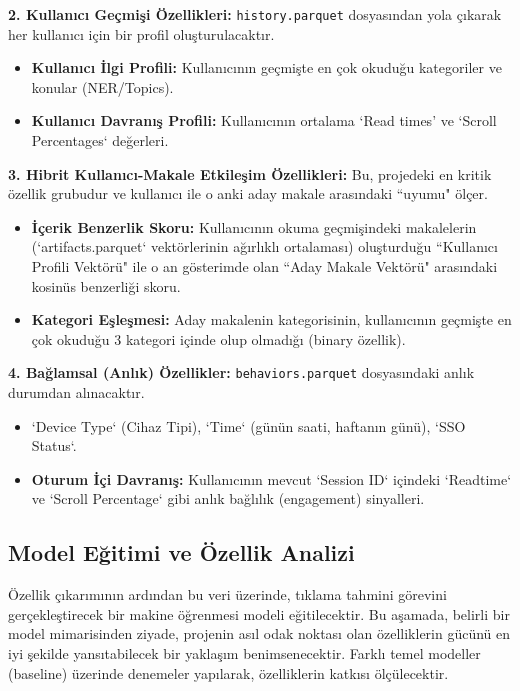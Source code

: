 \documentclass[conference]{IEEEtran}
\begin{document}
\textbf{2. Kullanıcı Geçmişi Özellikleri:} \texttt{history.parquet} dosyasından yola çıkarak her kullanıcı için bir profil oluşturulacaktır.
\begin{itemize}
    \item \textbf{Kullanıcı İlgi Profili:} Kullanıcının geçmişte en çok okuduğu kategoriler ve konular (NER/Topics).
    \item \textbf{Kullanıcı Davranış Profili:} Kullanıcının ortalama `Read times' ve `Scroll Percentages` değerleri.
\end{itemize}

\textbf{3. Hibrit Kullanıcı-Makale Etkileşim Özellikleri:} Bu, projedeki en kritik özellik grubudur ve kullanıcı ile o anki aday makale arasındaki ``uyumu" ölçer.
\begin{itemize}
    \item \textbf{İçerik Benzerlik Skoru:} Kullanıcının okuma geçmişindeki makalelerin (`artifacts.parquet` vektörlerinin ağırlıklı ortalaması) oluşturduğu ``Kullanıcı Profili Vektörü" ile o an gösterimde olan ``Aday Makale Vektörü" arasındaki kosinüs benzerliği skoru.
    \item \textbf{Kategori Eşleşmesi:} Aday makalenin kategorisinin, kullanıcının geçmişte en çok okuduğu 3 kategori içinde olup olmadığı (binary özellik).
\end{itemize}

\textbf{4. Bağlamsal (Anlık) Özellikler:} \texttt{behaviors.parquet} dosyasındaki anlık durumdan alınacaktır.
\begin{itemize}
    \item `Device Type` (Cihaz Tipi), `Time` (günün saati, haftanın günü), `SSO Status`.
    \item \textbf{Oturum İçi Davranış:} Kullanıcının mevcut `Session ID` içindeki `Readtime` ve `Scroll Percentage` gibi anlık bağlılık (engagement) sinyalleri.
\end{itemize}

\subsection{Model Eğitimi ve Özellik Analizi}
Özellik çıkarımının ardından bu veri üzerinde, tıklama tahmini görevini gerçekleştirecek bir makine öğrenmesi modeli eğitilecektir. Bu aşamada, belirli bir model mimarisinden ziyade, projenin asıl odak noktası olan özelliklerin gücünü en iyi şekilde yansıtabilecek bir yaklaşım benimsenecektir. Farklı temel modeller (baseline) üzerinde denemeler yapılarak, özelliklerin katkısı ölçülecektir.
\end{document}
